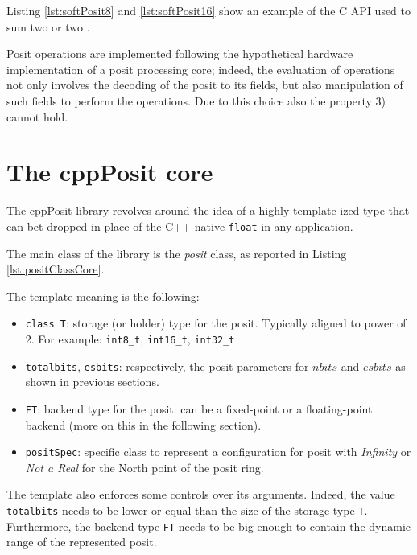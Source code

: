 Listing \ref{lst:softPosit8} and \ref{lst:softPosit16} show an example of the C API used to sum two  or two .






Posit operations are implemented following the hypothetical hardware implementation of a posit processing core; indeed, the evaluation of operations not only involves the decoding of the posit to its fields, but also manipulation of such fields to perform the operations. Due to this choice also the property 3) cannot hold.

\section{The cppPosit core}\label{sec:cppPositCore}

The cppPosit library revolves around the idea of a highly template-ized type that can bet dropped in place of the C++ native \texttt{float} in any application. 

The main class of the library is the \textit{posit} class, as reported in Listing \ref{lst:positClassCore}.  



The template meaning is the following:
\begin{itemize}
    \item \texttt{class T}: storage (or holder) type for the posit. Typically aligned to power of 2. For example: \texttt{int8\_t}, \texttt{int16\_t}, \texttt{int32\_t}
    \item \texttt{totalbits}, \texttt{esbits}: respectively, the posit parameters for $nbits$ and $esbits$ as shown in previous sections.
    \item \texttt{FT}: backend type for the posit: can be a fixed-point or a floating-point backend (more on this in the following section).
    \item \texttt{positSpec}: specific class to represent a configuration for posit with \textit{Infinity} or \textit{Not a Real} for the North point of the posit ring.
\end{itemize}

The template also enforces some controls over its arguments. Indeed, the value \texttt{totalbits} needs to be lower or equal than the size of the storage type \texttt{T}. Furthermore, the backend type \texttt{FT} needs to be big enough to contain the dynamic range of the represented posit.


